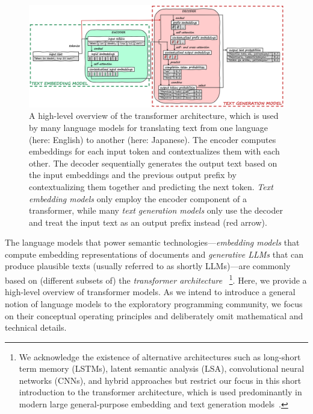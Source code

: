 \begin{figure}[Z]
	\centering
	\includegraphics[width=\linewidth]{04_semtec/transformer.png}
	\caption[A high-level overview of the \emph{transformer architecture} for large language models that embed and generate text.]{
		A high-level overview of the transformer architecture, which is used by many language models for translating text from one language (here: English) to another (here: Japanese).
		The encoder computes embeddings for each input token and contextualizes them with each other.
		The decoder sequentially generates the output text based on the input embeddings and the previous output prefix by contextualizing them together and predicting the next token.
		\emph{Text embedding models} only employ the encoder component of a transformer, while many \emph{text generation models} only use the decoder and treat the input text as an output prefix instead (\textcolor[HTML]{c00000}{red} arrow).
	}
	\label{fig:background/semtec/transformer}
\end{figure}

The language models that power semantic technologies---\emph{embedding models} that compute embedding representations of documents and \emph{generative LLMs} that can produce plausible texts (usually referred to as shortly LLMs)---are commonly based on (different subsets of) the \emph{transformer architecture}~\cite{vaswani2017attention}%
\footnote{
	We acknowledge the existence of alternative architectures such as long-short term memory (LSTMs), latent semantic analysis (LSA), convolutional neural networks (CNNs), and hybrid approaches but restrict our focus in this short introduction to the transformer architecture, which is used predominantly in modern large general-purpose embedding and text generation models~\cite{oralkbekova2023contemporary}.
}.
Here, we provide a high-level overview of transformer models.
As we intend to introduce a general notion of language models to the exploratory programming community, we focus on their conceptual operating principles and deliberately omit mathematical and technical details.

